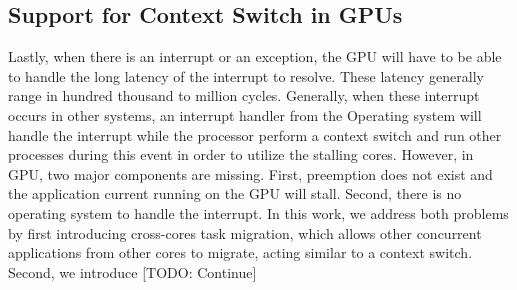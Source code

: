 \subsection{Support for Context Switch in GPUs}

Lastly, when there is an interrupt or an exception, the GPU will have to be
able to handle the long latency of the interrupt to resolve. These latency
generally range in hundred thousand to million cycles. Generally, when these
interrupt occurs in other systems, an interrupt handler from the Operating
system will handle the interrupt while the processor perform a context switch
and run other processes during this event in order to utilize the stalling
cores. However, in GPU, two major components are missing.  First, preemption
does not exist and the application current running on the GPU will stall.
Second, there is no operating system to handle the interrupt. In this work, we
address both problems by first introducing cross-cores task migration, which
allows other concurrent applications from other cores to migrate, acting
similar to a context switch. Second, we introduce [TODO: Continue]




